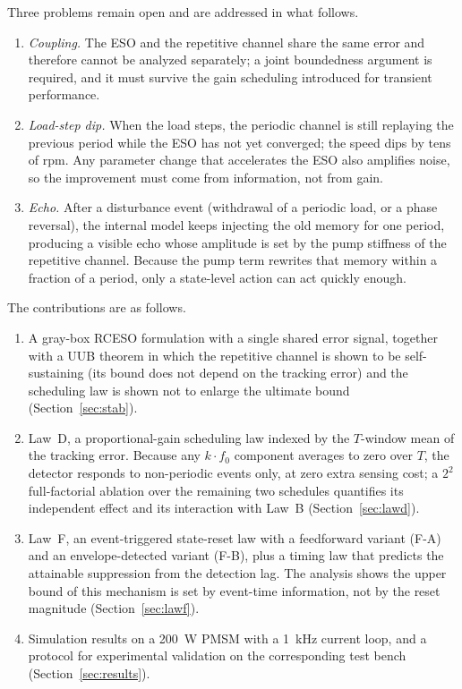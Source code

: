 \documentclass[journal]{IEEEtran}
\theoremstyle{remark}
\begin{document}
Three problems remain open and are addressed in what follows.
\begin{enumerate}
\item \emph{Coupling.} The ESO and the repetitive channel share the same
error and therefore cannot be analyzed separately; a joint boundedness argument is
required, and it must survive the gain scheduling introduced for transient performance.
\item \emph{Load-step dip.} When the load steps, the periodic channel is still
replaying the previous period while the ESO has not yet converged; the speed dips by
tens of rpm. Any parameter change that accelerates the ESO also amplifies noise, so
the improvement must come from information, not from gain.
\item \emph{Echo.} After a disturbance event (withdrawal of a periodic load, or a
phase reversal), the internal model keeps injecting the old memory for one period,
producing a visible echo whose amplitude is set by the pump stiffness of the
repetitive channel. Because the pump term rewrites that memory within a fraction of a
period, only a state-level action can act quickly enough.
\end{enumerate}

The contributions are as follows.
\begin{enumerate}
\item A gray-box RCESO formulation with a single shared error signal, together with
a UUB theorem in which the repetitive channel is shown to be self-sustaining (its
bound does not depend on the tracking error) and the scheduling law is shown not to
enlarge the ultimate bound (Section~\ref{sec:stab}).
\item Law~D, a proportional-gain scheduling law indexed by the $T$-window mean of the
tracking error. Because any $k\cdot f_0$ component averages to zero over $T$, the
detector responds to non-periodic events only, at zero extra sensing cost; a $2^2$
full-factorial ablation over the remaining two schedules quantifies its independent
effect and its interaction with Law~B (Section~\ref{sec:lawd}).
\item Law~F, an event-triggered state-reset law with a feedforward variant (F-A) and
an envelope-detected variant (F-B), plus a timing law that predicts the attainable
suppression from the detection lag. The analysis shows the upper bound of this
mechanism is set by event-time information, not by the reset magnitude
(Section~\ref{sec:lawf}).
\item Simulation results on a 200~W PMSM with a 1~kHz current loop, and a protocol for
experimental validation on the corresponding test bench
(Section~\ref{sec:results}).
\end{enumerate}
\end{document}
